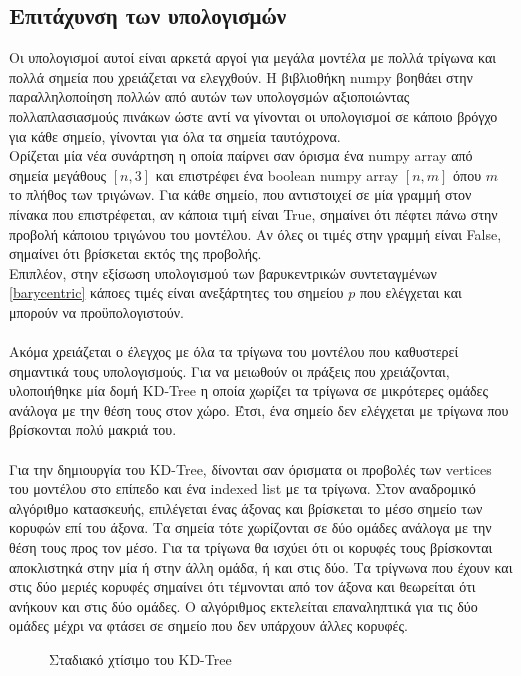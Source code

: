 \documentclass{report}
\begin{document}
\subsection{Επιτάχυνση των υπολογισμών}
Οι υπολογισμοί αυτοί είναι αρκετά αργοί για μεγάλα μοντέλα με πολλά τρίγωνα και πολλά σημεία που χρειάζεται να ελεγχθούν.
Η βιβλιοθήκη numpy βοηθάει στην παραλληλοποίηση πολλών από αυτών των υπολογσμών αξιοποιώντας πολλαπλασιασμούς πινάκων ώστε
αντί να γίνονται οι υπολογισμοί σε κάποιο βρόγχο για κάθε σημείο, γίνονται για όλα τα σημεία ταυτόχρονα.\\
Ορίζεται μία νέα συνάρτηση η οποία παίρνει σαν όρισμα ένα numpy array από σημεία μεγάθους $\left[n, 3\right]$ και επιστρέφει
ένα boolean numpy array $\left[n, m\right]$ όπου $m$ το πλήθος των τριγώνων. Για κάθε σημείο, που αντιστοιχεί σε μία γραμμή στον πίνακα
που επιστρέφεται, αν κάποια τιμή είναι True, σημαίνει ότι πέφτει πάνω στην προβολή κάποιου τριγώνου του μοντέλου. Αν όλες οι τιμές στην γραμμή
είναι False, σημαίνει ότι βρίσκεται εκτός της προβολής.
\\
Επιπλέον, στην εξίσωση υπολογισμού των βαρυκεντρικών συντεταγμένων \eqref{barycentric} κάποες τιμές είναι ανεξάρτητες
του σημείου $p$ που ελέγχεται και μπορούν να προϋπολογιστούν.
\\\\
Ακόμα χρειάζεται ο έλεγχος με όλα τα τρίγωνα του μοντέλου που καθυστερεί σημαντικά τους υπολογισμούς. Για να μειωθούν οι πράξεις που
χρειάζονται, υλοποιήθηκε μία δομή KD-Tree η οποία χωρίζει τα τρίγωνα σε μικρότερες ομάδες ανάλογα με την θέση τους στον χώρο. Έτσι, ένα
σημείο δεν ελέγχεται με τρίγωνα που βρίσκονται πολύ μακριά του.
\\\\
Για την δημιουργία του KD-Tree, δίνονται σαν όρισματα οι προβολές των vertices του μοντέλου στο επίπεδο και ένα indexed list
με τα τρίγωνα. Στον αναδρομικό αλγόριθμο κατασκευής, επιλέγεται ένας άξονας και βρίσκεται το μέσο σημείο των κορυφών επί του άξονα.
Τα σημεία τότε χωρίζονται σε δύο ομάδες ανάλογα με την θέση τους προς τον μέσο. Για τα τρίγωνα θα ισχύει ότι οι κορυφές τους βρίσκονται
αποκλιστηκά στην μία ή στην άλλη ομάδα, ή και στις δύο. Τα τρίγνωνα που έχουν και στις δύο μεριές κορυφές σημαίνει ότι τέμνονται
από τον άξονα και θεωρείται ότι ανήκουν και στις δύο ομάδες. Ο αλγόριθμος εκτελείται επαναληπτικά για τις δύο ομάδες μέχρι να
φτάσει σε σημείο που δεν υπάρχουν άλλες κορυφές.

\begin{figure}[H] 
    \centering
    \captionsetup{font=small}
    \captionsetup{font=normal}
    \caption{Σταδιακό χτίσιμο του KD-Tree}
\end{figure}
\end{document}
